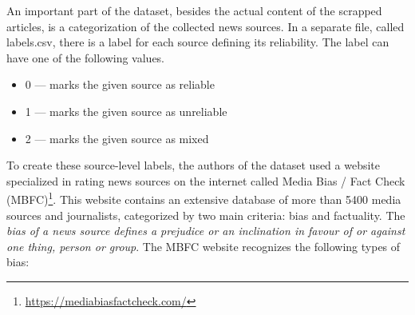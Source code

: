 An important part of the dataset, besides the actual content of the scrapped articles, is a categorization of the collected news sources. In a separate file, called labels.csv, there is a label for each source defining its reliability. The label can have one of the following values.

\begin{itemize}
    \item 0 --- marks the given source as reliable
    \item 1 --- marks the given source as unreliable
    \item 2 --- marks the given source as mixed
\end{itemize}

To create these source-level labels, the authors of the dataset used a website specialized in rating news sources on the internet called Media Bias / Fact Check (MBFC)\footnote{\url{https://mediabiasfactcheck.com/}}. This website contains an extensive database of more than 5400 media sources and journalists, categorized by two main criteria: bias and factuality. 
The \emph{bias of a news source defines a prejudice or an inclination in favour of or against one thing, person or group}. The MBFC website recognizes the following types of bias:

